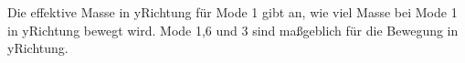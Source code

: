 \documentclass[letterpaper,10pt,german]{jupyterBook}
\begin{document}
\begin{sphinxVerbatim}[commandchars=\\\{\}]
\end{sphinxVerbatim}

\sphinxAtStartPar
Die effektive Masse in y\sphinxhyphen{}Richtung für Mode 1 gibt an, wie viel Masse bei Mode 1 in y\sphinxhyphen{}Richtung bewegt wird. Mode 1,6 und 3 sind maßgeblich für die Bewegung in y\sphinxhyphen{}Richtung.
\end{document}
